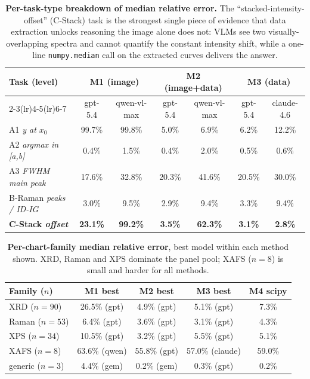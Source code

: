\begin{table}[t]
\centering
\caption{\textbf{Per-task-type breakdown of median relative error.}
The ``stacked-intensity-offset'' (C-Stack) task is the strongest single
piece of evidence that data extraction unlocks reasoning the image alone
does not: VLMs see two visually-overlapping spectra and cannot quantify
the constant intensity shift, while a one-line \texttt{numpy.median} call
on the extracted curves delivers the answer.}
\label{tab:mr-rigorous-by-task}
\small
\begin{tabular}{lcccccc}
\toprule
\multirow{2}{*}{Task (level)} &
\multicolumn{2}{c}{M1 (image)} &
\multicolumn{2}{c}{M2 (image+data)} &
\multicolumn{2}{c}{M3 (data)} \\
\cmidrule(lr){2-3}\cmidrule(lr){4-5}\cmidrule(lr){6-7}
& gpt-5.4 & qwen-vl-max & gpt-5.4 & qwen-vl-max & gpt-5.4 & claude-4.6 \\
\midrule
A1 \emph{y at $x_0$}            & 99.7\%  & 99.8\%  & 5.0\%  & 6.9\%  & 6.2\%  & 12.2\% \\
A2 \emph{argmax in [a,b]}       &  0.4\%  &  1.5\%  & 0.4\%  & 2.0\%  & 0.5\%  &  0.6\% \\
A3 \emph{FWHM main peak}        & 17.6\%  & 32.8\%  & 20.3\% & 41.6\% & 20.5\% & 30.0\% \\
B-Raman \emph{peaks / ID-IG}    &  3.0\%  &  9.5\%  & 2.9\%  & 9.4\%  & 3.3\%  &  9.4\% \\
\textbf{C-Stack \emph{offset}}  & \textbf{23.1\%} & \textbf{99.2\%} & \textbf{3.5\%} & \textbf{62.3\%} & \textbf{3.1\%} & \textbf{2.8\%} \\
\bottomrule
\end{tabular}
\end{table}


\begin{table}[t]
\centering
\caption{\textbf{Per-chart-family median relative error}, best model
within each method shown. XRD, Raman and XPS dominate the panel pool;
XAFS ($n{=}8$) is small and harder for all methods.}
\label{tab:mr-rigorous-by-family}
\small
\begin{tabular}{lcccc}
\toprule
Family ($n$) & M1 best & M2 best & M3 best & M4 scipy \\
\midrule
XRD ($n{=}90$)     & 26.5\% (gpt) &  4.9\% (gpt) &  5.1\% (gpt) &  7.3\% \\
Raman ($n{=}53$)   &  6.4\% (gpt) &  3.6\% (gpt) &  3.1\% (gpt) &  4.3\% \\
XPS ($n{=}34$)     & 10.5\% (gpt) &  3.2\% (gpt) &  5.5\% (gpt) &  5.1\% \\
XAFS ($n{=}8$)     & 63.6\% (qwen)& 55.8\% (gpt) & 57.0\% (claude) & 59.0\% \\
generic ($n{=}3$)  &  4.4\% (gem) &  0.2\% (gem) &  0.3\% (gpt) &  0.2\% \\
\bottomrule
\end{tabular}
\end{table}

